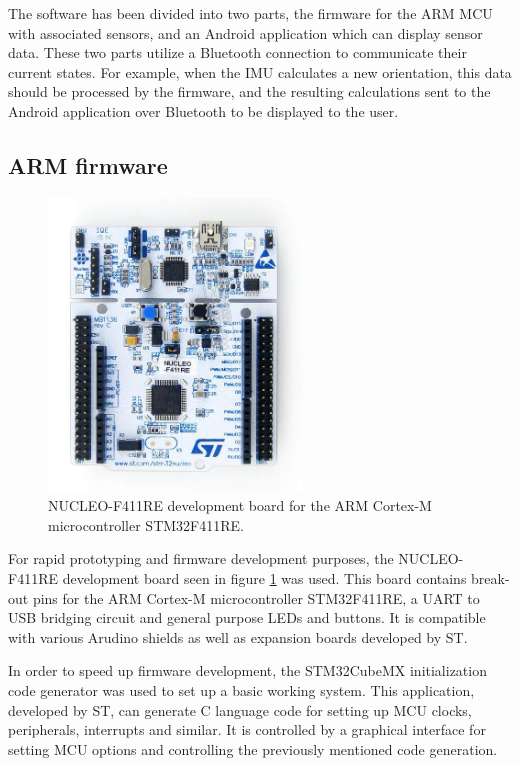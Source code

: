 The software has been divided into two parts, the firmware for the ARM MCU with associated sensors, and an Android application which can display sensor data. These two parts utilize a Bluetooth connection to communicate their current states. For example, when the IMU calculates a new orientation, this data should be processed by the firmware, and the resulting calculations sent to the Android application over Bluetooth to be displayed to the user.

\subsection{ARM firmware}

\begin{figure}[H]
\centering
\includegraphics[width=0.6\textwidth]{Figures/stm32nucleo.jpg}
\caption{NUCLEO-F411RE development board for the ARM Cortex-M microcontroller STM32F411RE.}
\label{nucleo-board}
\end{figure}

For rapid prototyping and firmware development purposes, the NUCLEO-F411RE development board seen in figure \ref{nucleo-board} was used. This board contains break-out pins for the ARM Cortex-M microcontroller STM32F411RE, a UART to USB bridging circuit and general purpose LEDs and buttons. It is compatible with various Arudino shields as well as expansion boards developed by ST.

In order to speed up firmware development, the STM32CubeMX \cite{stm32cubemx} initialization code generator was used to set up a basic working system. This application, developed by ST, can generate C language code for setting up MCU clocks, peripherals, interrupts and similar. It is controlled by a graphical interface for setting MCU options and controlling the previously mentioned code generation.

